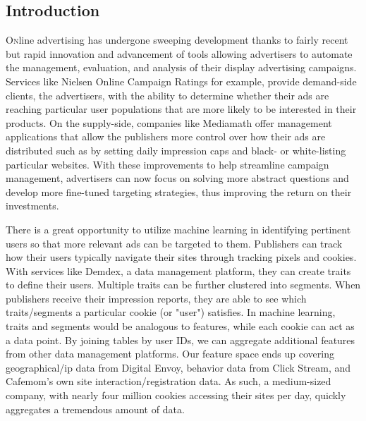 \documentclass[twoside]{article}
\begin{document}
\begin{multicols}{2} %

\section{Introduction}

\lettrine[nindent=0em,lines=3]{O} nline advertising has undergone sweeping development thanks to fairly recent but rapid innovation and advancement of tools allowing advertisers to automate the management, evaluation, and analysis of their display advertising campaigns. Services like Nielsen Online Campaign Ratings for example, provide demand-side clients, the advertisers, with the ability to determine whether their ads are reaching particular user populations that are more likely to be interested in their products. On the supply-side, companies like Mediamath offer management applications that allow the publishers more control over how their ads are distributed such as by setting daily impression caps and black- or white-listing particular websites. With these improvements to help streamline campaign management, advertisers can now focus on solving more abstract questions and develop more fine-tuned targeting strategies, thus improving the return on their investments\cite{12}.

There is a great opportunity to utilize machine learning in identifying pertinent users so that more relevant ads can be targeted to them. Publishers can track how their users typically navigate their sites through tracking pixels and cookies\cite{13}. With services like Demdex, a data management platform, they can create traits to define their users. Multiple traits can be further clustered into segments. When publishers receive their impression reports, they are able to see which traits/segments a particular cookie (or "user") satisfies. In machine learning, traits and segments would be analogous to features, while each cookie can act as a data point. By joining tables by user IDs, we can aggregate additional features from other data management platforms. Our feature space ends up covering geographical/ip data from Digital Envoy, behavior data from Click Stream, and Cafemom's own site interaction/registration data. As such, a medium-sized company, with nearly four million cookies accessing their sites per day, quickly aggregates a tremendous amount of data.


\end{multicols}
\end{document}
